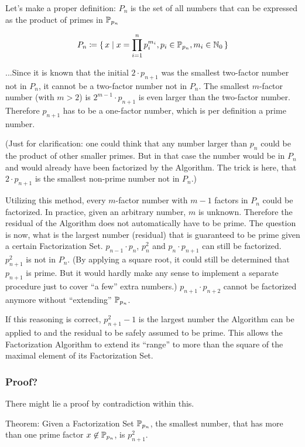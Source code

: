 \documentclass[a4paper,10pt]{article}
\begin{document}
Let's make a proper definition:
$P_n$ is the set of all numbers that can be expressed as the product of primes in $\mathbb{P}_{p_n}$

$$ P_n \coloneq \lbrace \, { {x} \;|\; {x = \prod_{i=1}^n p_i^{m_i}, p_i \in \mathbb{P}_{p_n}, m_i \in \mathbb{N}_0 } } \, \rbrace$$

...Since it is known that the initial $2 \cdot p_{n+1}$ was the smallest two-factor number
not in $P_n$, it cannot be a two-factor number not in  $P_n$.
The smallest $m$-factor number (with $m > 2$) is $2^{m-1} \cdot p_{n+1}$ is even larger than
the two-factor number.
Therefore $p_{n+1}$ has to be a one-factor number, which is per definition a prime number.

(Just for clarification: one could think that any number larger than $p_n$ could
be the product of other smaller primes.
But in that case the number would be in $P_n$ and would already have been factorized
by the Algorithm.
The trick is here, that $2 \cdot p_{n+1}$ is the smallest non-prime number not in $P_n$.)

Utilizing this method, every $m$-factor number with $m-1$ factors in $P_n$ could
be factorized.
In practice, given an arbitrary number, $m$ is unknown.
Therefore the residual of the Algorithm does not automatically have to be prime.
The question is now, what is the largest number (residual) that is guaranteed to be prime
given a certain Factorization Set.
$p_{n-1} \cdot p_n$, $p_n^2$ and $p_n \cdot p_{n+1}$ can still be factorized.
$p_{n+1}^2$ is not in $P_n$.
(By applying a square root, it could still be determined that $p_{n+1}$ is prime.
But it would hardly make any sense to implement a separate procedure just to cover
``a few'' extra numbers.)
$p_{n+1} \cdot p_{n+2}$ cannot be factorized anymore without ``extending'' $\mathbb{P}_{p_n}$.

If this reasoning is correct, $p_{n+1}^2 - 1$ is the largest number
the Algorithm can be applied to and the residual to be safely assumed to be prime.
This allows the Factorization Algorithm to extend its ``range'' to more than the
square of the maximal element of its Factorization Set.

\subsubsection*{Proof?}


There might lie a proof by contradiction within this.

Theorem:
Given a Factorization Set $\mathbb{P}_{p_n}$,
the smallest number,
that has more than one prime factor $x \not\in \mathbb{P}_{p_n}$,
is $p_{n+1}^2$.
\end{document}
